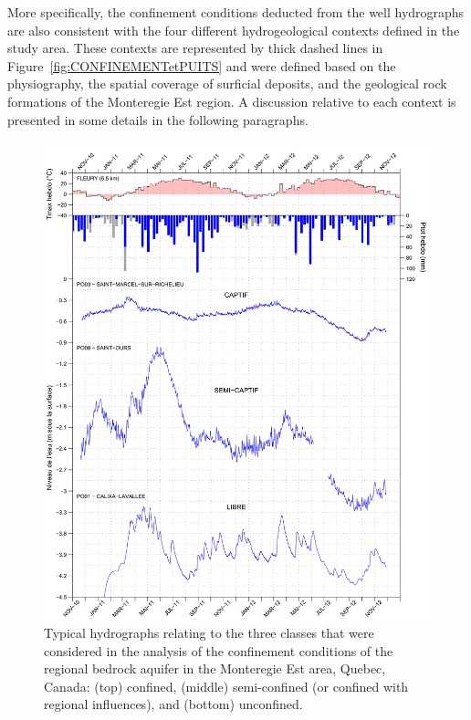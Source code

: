 \documentclass[WHATMANUAL.tex]{subfiles}
\begin{document}
More specifically, the confinement conditions deducted from the well hydrographs are also consistent with the four different hydrogeological contexts defined in the study area. These contexts are represented by thick dashed lines in Figure~\ref{fig:CONFINEMENTetPUITS} and were defined based on the physiography, the spatial coverage of surficial deposits, and the geological rock formations of the Monteregie Est region. A discussion relative to each context is presented in some details in the following paragraphs.

\begin{figure}[!hb]
\centering
\includegraphics[height=0.85\textheight]{img/CasTypes.png}
\caption[Typical hydrographs relating to the three classes that were considered in the analysis of the confinement conditions of the regional bedrock aquifer in the Monteregie Est area, Quebec, Canada.]{Typical hydrographs relating to the three classes that were considered in the analysis of the confinement conditions of the regional bedrock aquifer in the Monteregie Est area, Quebec, Canada: (top) confined, (middle) semi-confined (or confined with regional influences), and (bottom) unconfined.}
\label{fig:casTypes_hydrographs}
\end{figure}
\end{document}
